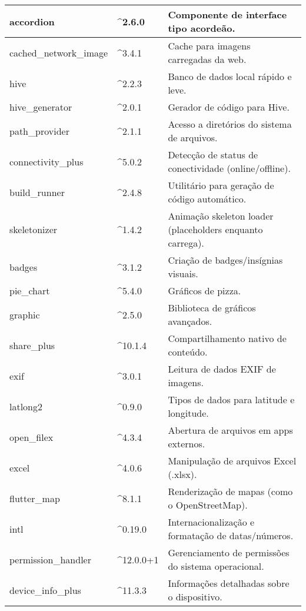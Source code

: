 \begin{table}[H]
\begin{tabular}{|p{4cm}|p{2.5cm}|p{8cm}|}
    accordion & \^{}2.6.0 & Componente de interface tipo acordeão. \\ \hline
    cached\_network\_image & \^{}3.4.1 & Cache para imagens carregadas da web. \\ \hline
    hive & \^{}2.2.3 & Banco de dados local rápido e leve. \\ \hline
    hive\_generator & \^{}2.0.1 & Gerador de código para Hive. \\ \hline
    path\_provider & \^{}2.1.1 & Acesso a diretórios do sistema de arquivos. \\ \hline
    connectivity\_plus & \^{}5.0.2 & Detecção de status de conectividade (online/offline). \\ \hline
    build\_runner & \^{}2.4.8 & Utilitário para geração de código automático. \\ \hline
    skeletonizer & \^{}1.4.2 & Animação skeleton loader (placeholders enquanto carrega). \\ \hline
    badges & \^{}3.1.2 & Criação de badges/insígnias visuais. \\ \hline
    pie\_chart & \^{}5.4.0 & Gráficos de pizza. \\ \hline
    graphic & \^{}2.5.0 & Biblioteca de gráficos avançados. \\ \hline
    share\_plus & \^{}10.1.4 & Compartilhamento nativo de conteúdo. \\ \hline
    exif & \^{}3.0.1 & Leitura de dados EXIF de imagens. \\ \hline
    latlong2 & \^{}0.9.0 & Tipos de dados para latitude e longitude. \\ \hline
    open\_filex & \^{}4.3.4 & Abertura de arquivos em apps externos. \\ \hline
    excel & \^{}4.0.6 & Manipulação de arquivos Excel (.xlsx). \\ \hline
    flutter\_map & \^{}8.1.1 & Renderização de mapas (como o OpenStreetMap). \\ \hline
    intl & \^{}0.19.0 & Internacionalização e formatação de datas/números. \\ \hline
    permission\_handler & \^{}12.0.0+1 & Gerenciamento de permissões do sistema operacional. \\ \hline
    device\_info\_plus & \^{}11.3.3 & Informações detalhadas sobre o dispositivo. \\ \hline
    \end{tabular}
    \label{tab:dependencias_flutter}
\end{table}
    
